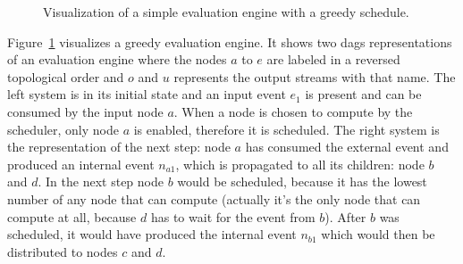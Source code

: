 \begin{figure}
  \caption{Visualization of a simple evaluation engine with a greedy schedule.}
\label{fig:chap5:sec_greedy:visual_dag}
\end{figure}

Figure~\ref{fig:chap5:sec_greedy:visual_dag} visualizes a greedy evaluation engine.
It shows two \glspl{dag} representations of an evaluation engine  where the nodes \(a\) to \(e\) are labeled in a reversed topological order and \(o\) and \(u\) represents the output streams with that name.
The left system is in its initial state and an input event \(e_1\) is present and can be consumed by the input node \(a\).
When a node is chosen to compute by the scheduler, only node \(a\) is enabled, therefore it is scheduled.
The right system is the representation of the next step: node \(a\) has consumed the external event and produced an internal event \(n_{a1}\), which is propagated to all its children: node \(b\) and \(d\).
In the next step node \(b\) would be scheduled, because it has the lowest number of any node that can compute (actually it's the only node that can compute at all, because \(d\) has to wait for the event from \(b\)).
After \(b\) was scheduled, it would have produced the internal event \(n_{b1}\) which would then be distributed to nodes \(c\) and \(d\).

